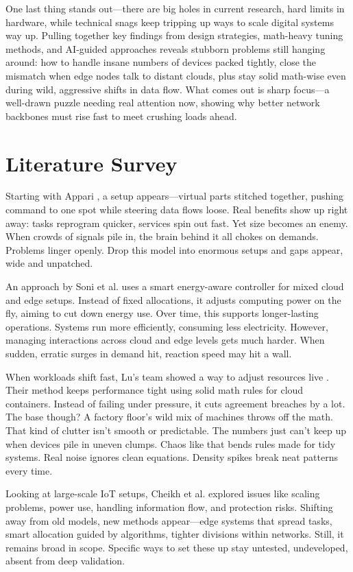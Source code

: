 \documentclass[a4paper,fleqn]{cas-dc}
\numberwithin{equation}{section}
\begin{document}
One last thing stands out—there are big holes in current research, hard limits in hardware, while technical snags keep tripping up ways to scale digital systems way up. Pulling together key findings from design strategies, math-heavy tuning methods, and AI-guided approaches reveals stubborn problems still hanging around: how to handle insane numbers of devices packed tightly, close the mismatch when edge nodes talk to distant clouds, plus stay solid math-wise even during wild, aggressive shifts in data flow. What comes out is sharp focus—a well-drawn puzzle needing real attention now, showing why better network backbones must rise fast to meet crushing loads ahead.

\section{Literature Survey}

Starting with Appari \cite{Appari2025SDN}, a setup appears—virtual parts stitched together, pushing command to one spot while steering data flows loose. Real benefits show up right away: tasks reprogram quicker, services spin out fast. Yet size becomes an enemy. When crowds of signals pile in, the brain behind it all chokes on demands. Problems linger openly. Drop this model into enormous setups and gaps appear, wide and unpatched.

An approach by Soni et al. \cite{Soni2026Intelligent} uses a smart energy-aware controller for mixed cloud and edge setups. Instead of fixed allocations, it adjusts computing power on the fly, aiming to cut down energy use. Over time, this supports longer-lasting operations. Systems run more efficiently, consuming less electricity. However, managing interactions across cloud and edge levels gets much harder. When sudden, erratic surges in demand hit, reaction speed may hit a wall.

When workloads shift fast, Lu's team showed a way to adjust resources live \cite{Lu2025Online}. Their method keeps performance tight using solid math rules for cloud containers. Instead of failing under pressure, it cuts agreement breaches by a lot. The base though? A factory floor's wild mix of machines throws off the math. That kind of clutter isn't smooth or predictable. The numbers just can't keep up when devices pile in uneven clumps. Chaos like that bends rules made for tidy systems. Real noise ignores clean equations. Density spikes break neat patterns every time.

Looking at large-scale IoT setups, Cheikh et al. \cite{Cheikh2025Energy} explored issues like scaling problems, power use, handling information flow, and protection risks. Shifting away from old models, new methods appear—edge systems that spread tasks, smart allocation guided by algorithms, tighter divisions within networks. Still, it remains broad in scope. Specific ways to set these up stay untested, undeveloped, absent from deep validation.
\end{document}
